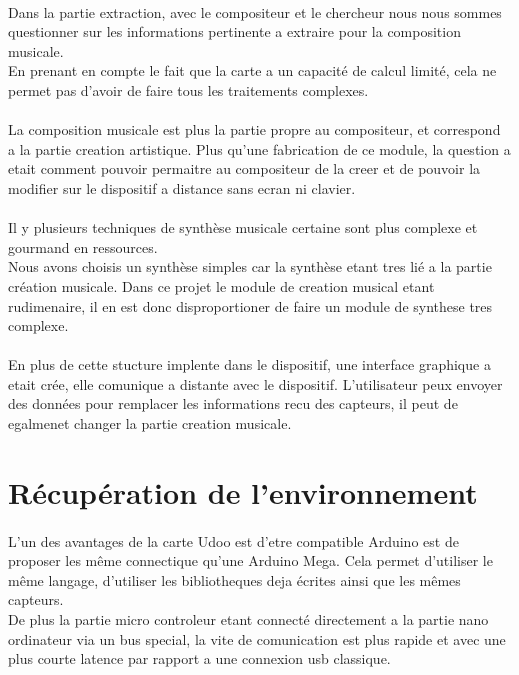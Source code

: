 \documentclass[a4paper, titlepage, oneside, 12pt]{article}%
\begin{document}
\paragraph{}
Dans la partie extraction, avec le compositeur et le chercheur nous nous sommes questionner sur les informations pertinente a extraire pour la composition musicale.\\ 
En prenant en compte le fait que la carte a un capacité de calcul limité, cela ne permet pas d'avoir de faire tous les traitements complexes.


\paragraph{}
La composition musicale est plus la partie propre au compositeur, et correspond a la partie creation artistique. Plus qu'une fabrication de ce module, la question a etait comment pouvoir permaitre au compositeur de la creer et de pouvoir la modifier sur le dispositif a distance sans ecran ni clavier.

\paragraph{}
Il y plusieurs techniques de synthèse musicale certaine sont plus complexe et gourmand en ressources.\\ Nous avons choisis un synthèse simples car la synthèse etant tres lié a la partie création musicale. Dans ce projet le module de creation musical etant rudimenaire, il en est donc disproportioner de faire un module de synthese tres complexe. 

\paragraph{}
En plus de cette stucture implente dans le dispositif, une interface graphique a etait crée, elle comunique a distante avec le dispositif. L'utilisateur peux envoyer des données pour remplacer les informations recu des capteurs, il peut de egalmenet changer la partie creation musicale.

\section{Récupération de l'environnement}
\paragraph{}
L'un des avantages de la carte Udoo est d'etre compatible Arduino est de proposer les même connectique qu'une Arduino Mega. Cela permet d'utiliser le même langage, d'utiliser les bibliotheques deja écrites ainsi que les mêmes capteurs.\\
De plus la partie  micro controleur etant connecté directement a la partie nano ordinateur via un bus special, la vite de comunication est plus rapide et avec une plus courte latence par rapport a une connexion usb classique.
\end{document}
